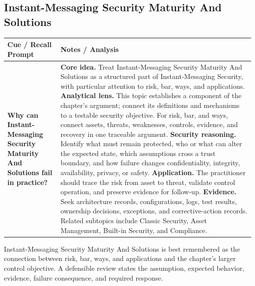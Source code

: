 \documentclass[11pt]{article}
\newcommand{\CornellHeader}{%
\rowcolor{Navy}\color{white}\bfseries Cue / Recall Prompt & \color{white}\bfseries Notes / Analysis\\\hline}
\newcommand{\CornellRow}[2]{%
\cellcolor{CueGray}\RaggedRight\textbf{#1} & \RaggedRight #2\\\hline}
\begin{document}
\subsection*{Instant-Messaging Security Maturity And Solutions}
\begin{longtable}{>{\RaggedRight\arraybackslash}p{}|>{\RaggedRight\arraybackslash}p{}}
\CornellHeader
\CornellRow{Why can Instant-Messaging Security Maturity And Solutions fail in practice?}{\textbf{Core idea.} Treat Instant-Messaging Security Maturity And Solutions as a structured part of Instant-Messaging Security, with particular attention to risk, bar, ways, and applications. \textbf{Analytical lens.} This topic establishes a component of the chapter's argument; connect its definitions and mechanisms to a testable security objective. For risk, bar, and ways, connect assets, threats, weaknesses, controls, evidence, and recovery in one traceable argument. \textbf{Security reasoning.} Identify what must remain protected, who or what can alter the expected state, which assumptions cross a trust boundary, and how failure changes confidentiality, integrity, availability, privacy, or safety. \textbf{Application.} The practitioner should trace the risk from asset to threat, validate control operation, and preserve evidence for follow-up. \textbf{Evidence.} Seek architecture records, configurations, logs, test results, ownership decisions, exceptions, and corrective-action records. Related subtopics include Classic Security, Asset Management, Built-in Security, and Compliance.}
\end{longtable}
\begin{topicsummary}
Instant-Messaging Security Maturity And Solutions is best remembered as the connection between risk, bar, ways, and applications and the chapter's larger control objective. A defensible review states the assumption, expected behavior, evidence, failure consequence, and required response.
\end{topicsummary}
\end{document}
